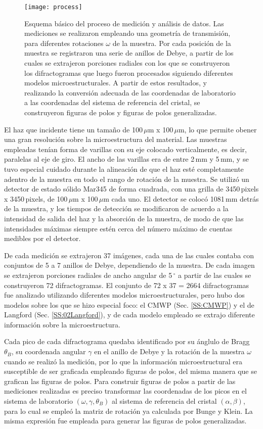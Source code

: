 \begin{figure}[!htb]
  \centering
  \texttt{[image: process]}
  \caption{Esquema básico del proceso de medición y análisis de datos. Las mediciones se realizaron empleando una geometría de transmisión, para diferentes rotaciones $\omega$ de la muestra. Por cada posición de la muestra se registraron una serie de anillos de Debye, a partir de los cuales se extrajeron porciones radiales con los que se construyeron los difractogramas que luego fueron procesados siguiendo diferentes modelos microestructurales. A partir de estos resultados, y realizando la conversión adecuada de las coordenadas de laboratorio a las coordenadas del sistema de referencia del cristal, se construyeron figuras de polos y figuras de polos generalizadas.}
  \label{fig:transmision}
\end{figure}

El haz que incidente tiene un tamaño de 100\,$\mu$m x 100\,$\mu$m, lo que permite obener una gran resolución sobre la microestructura del material.
Las muestras empleadas tenían forma de varillas con su eje colocado verticalmente, es decir, paralelas al eje de giro.
El ancho de las varillas era de entre 2\,mm y 5\,mm, y se tuvo especial cuidado durante la alineación de que el haz esté completamente adentro de la muestra en todo el rango de rotación de la muestra.
Se utilizó un detector de estado sólido Mar345 de forma cuadrada, con una grilla de 3450\,pixels x 3450\,pixels, de 100\,$\mu$m x 100\,$\mu$m cada uno.
El detector se colocó 1081\,mm detrás de la muestra, y los tiempos de detección se modificaron de acuerdo a la intensidad de salida del haz y la absorción de la muestra, de modo de que las intensidades máximas siempre estén cerca del número máximo de cuentas medibles por el detector.

De cada medición se extrajeron 37 imágenes, cada una de las cuales contaba con conjuntos de 5 a 7 anillos de Debye, dependiendo de la muestra.
De cada imagen se extrajeron porciones radiales de ancho angular de 5\,$^{\circ}$ a partir de las cuales se construyeron 72 difractogramas.
El conjunto de 72 x 37 = 2664 difractogramas fue analizado utilizando diferentes modelos microestructurales, pero hubo dos modelos sobre los que se hizo especial foco: el CMWP (Sec. \ref{SS:CMWP}) y el de Langford (Sec. \ref{SS:02Langford}), y de cada modelo empleado se extrajo diferente información sobre la microestructura.

Cada pico de cada difractograma quedaba identificado por su ánglulo de Bragg $\theta_B$, su coordenada angular $\gamma$ en el anillo de Debye y la rotación de la muestra $\omega$ cuando se realizó la medición, por lo que la información microestructural era susceptible de ser graficada empleando figuras de polos, del misma manera que se grafican las figuras de polos.
Para construir figuras de polos a partir de las mediciones realizadas es preciso transformar las coordenadas de los picos en el sistema de laboratorio $(\omega, \gamma, \theta_B)$ al sistema de referencia del cristal $(\alpha, \beta)$, para lo cual se empleó la matriz de rotación ya calculada por Bunge y Klein\cite{Bunge1996}.
La misma expresión fue empleada para generar las figuras de polos generalizadas.

